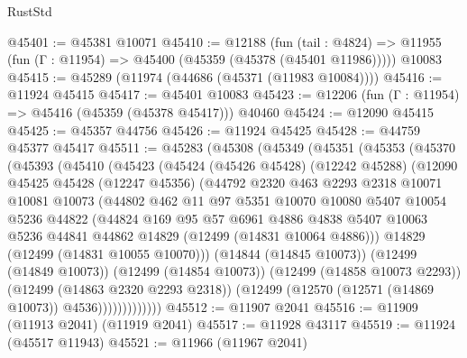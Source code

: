 \begin{lexlean}{RustStd}
\begin{coremodule}
{\begin{coremodule}
{{{{{{{{{{{{{{{{{{{{{{{{{{{{{{{{{{{{{{{{{{{{{{{{{{{{{{{{{{{{{{{{{{{{{{{{{{{{{{{{@45401 := @45381 @10071
@45410 := @12188
    (fun (tail : @4824) => @11955 (fun (Γ : @11954) => @45400 (@45359 (@45378 (@45401 @11986)))))
    @10083
@45415 := @45289 (@11974 (@44686 (@45371 (@11983 @10084))))
@45416 := @11924 @45415
@45417 := @45401 @10083
@45423 := @12206 (fun (Γ : @11954) => @45416 (@45359 (@45378 @45417))) @40460
@45424 := @12090 @45415
@45425 := @45357 @44756
@45426 := @11924 @45425
@45428 := @44759 @45377 @45417
@45511 := @45283
    (@45308
      (@45349
        (@45351
          (@45353
            (@45370
              (@45393
                (@45410
                  (@45423
                    (@45424
                      (@45426 @45428)
                      (@12242 @45288)
                      (@12090
                        @45425
                        @45428
                        (@12247 @45356)
                        (@44792
                          @2320
                          @463
                          @2293
                          @2318
                          @10071
                          @10081
                          @10073
                          (@44802
                            @462
                            @11
                            @97
                            @5351
                            @10070
                            @10080
                            @5407
                            @10054
                            @5236
                            @44822
                            (@44824
                              @169
                              @95
                              @57
                              @6961
                              @4886
                              @4838
                              @5407
                              @10063
                              @5236
                              @44841
                              @44862
                              @14829
                              (@12499 (@14831 @10064 @4886)))
                            @14829
                            (@12499 (@14831 @10055 @10070)))
                          (@14844 (@14845 @10073))
                          (@12499 (@14849 @10073))
                          (@12499 (@14854 @10073))
                          (@12499 (@14858 @10073 @2293))
                          (@12499 (@14863 @2320 @2293 @2318))
                          (@12499 (@12570 (@12571 (@14869 @10073)) @4536)))))))))))))
@45512 := @11907 @2041
@45516 := @11909 (@11913 @2041) (@11919 @2041)
@45517 := @11928 @43117
@45519 := @11924 (@45517 @11943)
@45521 := @11966 (@11967 @2041)
}}}}}}}}}}}}}}}}}}}}}}}}}}}}}}}}}}}}}}}}}}}}}}}}}}}}}}}}}}}}}}}}}}}}}}}}}}}}}}}}
\end{coremodule}}
\end{coremodule}
\end{lexlean}
